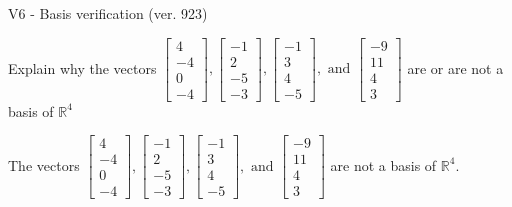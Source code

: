 \begin{exercise}
  \begin{exerciseTitle}V6 - Basis verification (ver. 923)\end{exerciseTitle}
  \begin{exerciseStatement}
    Explain why the vectors \(\left[\begin{array}{r}
4 \\
-4 \\
0 \\
-4
\end{array}\right] , \left[\begin{array}{r}
-1 \\
2 \\
-5 \\
-3
\end{array}\right] , \left[\begin{array}{r}
-1 \\
3 \\
4 \\
-5
\end{array}\right] , \text{ and } \left[\begin{array}{r}
-9 \\
11 \\
4 \\
3
\end{array}\right]\) are or are not a basis of \(\mathbb{R}^4\)	


  \end{exerciseStatement}
  \begin{exerciseAnswer}
   The vectors \(\left[\begin{array}{r}
4 \\
-4 \\
0 \\
-4
\end{array}\right] , \left[\begin{array}{r}
-1 \\
2 \\
-5 \\
-3
\end{array}\right] , \left[\begin{array}{r}
-1 \\
3 \\
4 \\
-5
\end{array}\right] , \text{ and } \left[\begin{array}{r}
-9 \\
11 \\
4 \\
3
\end{array}\right]\) 
  	 are not  a basis of \(\mathbb{R}^4\).
  


  \end{exerciseAnswer}
\end{exercise}